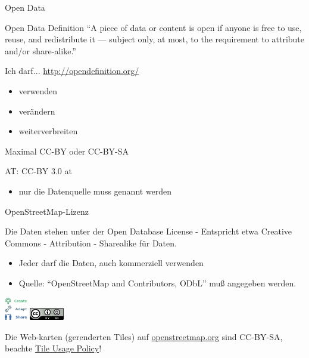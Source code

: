 \documentclass{beamer}
\begin{document}
\begin{frame}{Open Data}
	\begin{block}{Open Data Definition} 
	“A piece of data or content is open if anyone is free to use, reuse, and redistribute it — subject only, at most, to the requirement to attribute and/or share-alike.”
\end{block}


Ich darf... \hfill \url{http://opendefinition.org/}
	\begin{itemize}
		\item verwenden
		\item verändern
		\item weiterverbreiten
	\end{itemize}
	
	Maximal CC-BY oder CC-BY-SA

	\pause
	\vspace{3mm}
AT: CC-BY 3.0 at
\begin{itemize}
		                \item nur die Datenquelle muss genannt werden
			\end{itemize}
\end{frame}

\begin{frame}{OpenStreetMap-Lizenz}

Die Daten stehen unter der Open Database License - Entspricht etwa Creative Commons - Attribution - Sharealike für Daten.
\begin{itemize}
  \item Jeder darf die Daten, auch kommerziell verwenden
  \item Quelle: ``OpenStreetMap and Contributors, ODbL'' muß angegeben werden.
\end{itemize}

 \begin{center}
 \includegraphics[width=1cm]{ODbL.png}
 \hspace{2cm}
 \includegraphics[width=1.5cm]{cc-by-sa.png}
 \end{center}

\pause
Die Web-karten (gerenderten Tiles) auf \href{http://osm.org}{openstreetmap.org} sind CC-BY-SA, beachte \href{http://wiki.openstreetmap.org/wiki/Tile\_usage\_policy}{Tile Usage Policy}!

\end{frame}
\end{document}
